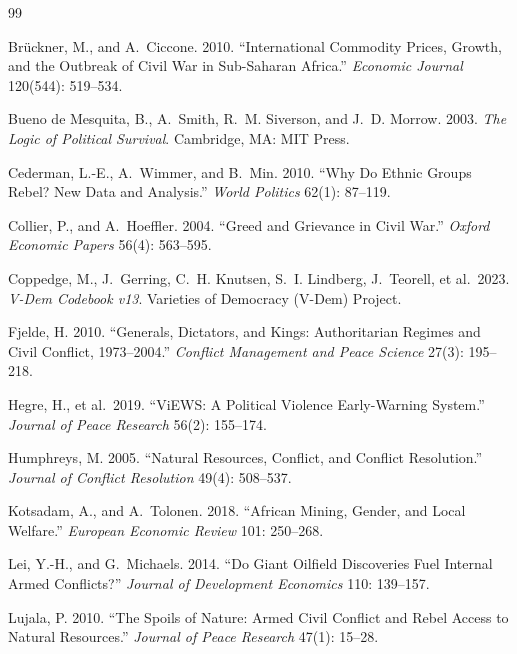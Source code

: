 \documentclass[12pt]{article}
\begin{document}
\begin{thebibliography}{99}

Br{\"u}ckner, M., and A.~Ciccone. 2010.
``International Commodity Prices, Growth, and the Outbreak of Civil War
  in Sub-Saharan Africa.''
\textit{Economic Journal} 120(544): 519--534.

Bueno de Mesquita, B., A.~Smith, R.~M. Siverson, and J.~D. Morrow. 2003.
\textit{The Logic of Political Survival}.
Cambridge, MA: MIT Press.

Cederman, L.-E., A.~Wimmer, and B.~Min. 2010.
``Why Do Ethnic Groups Rebel? New Data and Analysis.''
\textit{World Politics} 62(1): 87--119.

Collier, P., and A.~Hoeffler. 2004.
``Greed and Grievance in Civil War.''
\textit{Oxford Economic Papers} 56(4): 563--595.

Coppedge, M., J.~Gerring, C.~H. Knutsen, S.~I. Lindberg, J.~Teorell,
  et al.\ 2023.
\textit{V-Dem Codebook v13}.
Varieties of Democracy (V-Dem) Project.

Fjelde, H. 2010.
``Generals, Dictators, and Kings: Authoritarian Regimes and Civil Conflict,
  1973--2004.''
\textit{Conflict Management and Peace Science} 27(3): 195--218.

Hegre, H., et al.\ 2019.
``ViEWS: A Political Violence Early-Warning System.''
\textit{Journal of Peace Research} 56(2): 155--174.

Humphreys, M. 2005.
``Natural Resources, Conflict, and Conflict Resolution.''
\textit{Journal of Conflict Resolution} 49(4): 508--537.

Kotsadam, A., and A.~Tolonen. 2018.
``African Mining, Gender, and Local Welfare.''
\textit{European Economic Review} 101: 250--268.

Lei, Y.-H., and G.~Michaels. 2014.
``Do Giant Oilfield Discoveries Fuel Internal Armed Conflicts?''
\textit{Journal of Development Economics} 110: 139--157.

Lujala, P. 2010.
``The Spoils of Nature: Armed Civil Conflict and Rebel Access to
  Natural Resources.''
\textit{Journal of Peace Research} 47(1): 15--28.


\end{thebibliography}
\end{document}
